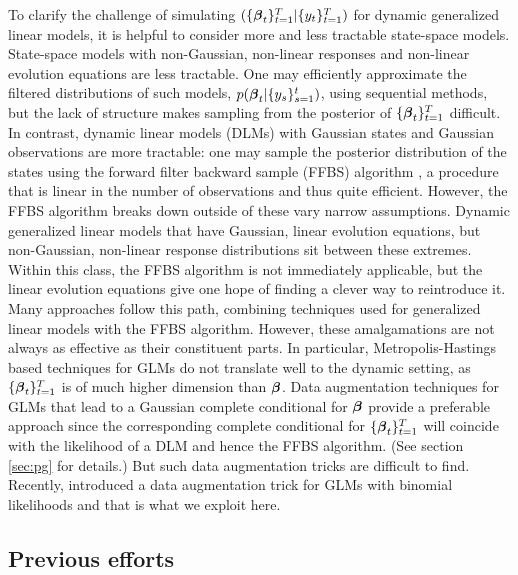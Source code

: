 \npoint To clarify the challenge of simulating $(\{\boldsymbol{\beta}_t\}_{t=1}^T |
\{y_t\}_{t=1}^T)$ for dynamic generalized linear models, it is helpful to
consider more and less tractable state-space models.  
\npoint State-space models with non-Gaussian, non-linear responses and
non-linear evolution equations are less tractable.  One may efficiently
approximate the filtered distributions of such models, $p(\boldsymbol{\beta}_t |
\{y_s\}_{s=1}^t)$, using sequential methods, but the lack of structure makes
sampling from the posterior of $\{\boldsymbol{\beta}_t\}_{t=1}^T$ difficult.  
\npoint In contrast, dynamic linear models (DLMs) with Gaussian states and
Gaussian observations are more tractable: one may sample the posterior
distribution of the states using the forward filter backward sample (FFBS)
algorithm \citep{carter-kohn-1994, fruhwirth-schnatter-1994}, a procedure that
is linear in the number of observations and thus quite efficient.  However, the
FFBS algorithm breaks down outside of these vary narrow assumptions.
\npoint Dynamic generalized linear models that have Gaussian, linear evolution
equations, but non-Gaussian, non-linear response distributions sit between these
extremes.  Within this class, the FFBS algorithm is not immediately applicable,
but the linear evolution equations give one hope of finding a clever way to
reintroduce it.  Many approaches follow this path, combining techniques used for
generalized linear models with the FFBS algorithm.  However, these amalgamations
are not always as effective as their constituent parts.  In particular,
Metropolis-Hastings based techniques for GLMs do not translate well to the
dynamic setting, as $\{\boldsymbol{\beta}_t\}_{t=1}^T$ is of much higher dimension than
$\boldsymbol{\beta}$.  
\npoint Data augmentation techniques for GLMs that lead to a Gaussian complete
conditional for $\boldsymbol{\beta}$ provide a preferable approach since the corresponding
complete conditional for $\{\boldsymbol{\beta}_t\}_{t=1}^T$ will coincide with the
likelihood of a DLM and hence the FFBS algorithm.  (See section \ref{sec:pg} for
details.)  But such data augmentation tricks are difficult to find.  Recently,
\citet{polson-etal-2013} introduced a data augmentation trick for GLMs with
binomial likelihoods and that is what we exploit here.

\subsection{Previous efforts}
\label{sec:previous-efforts}


